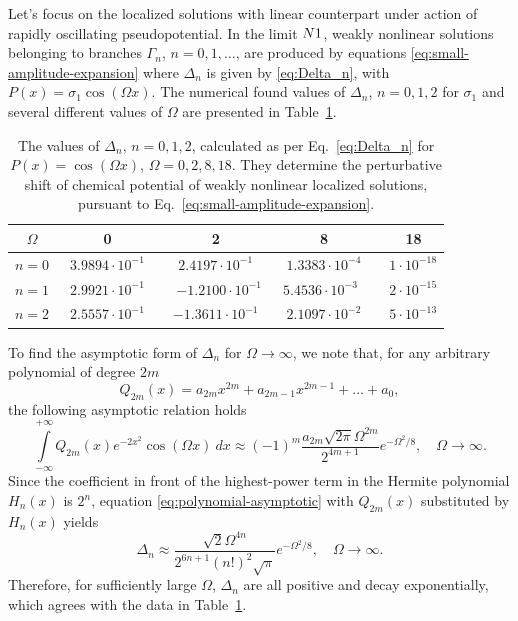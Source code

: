 Let's focus on the localized solutions with linear counterpart under action of rapidly oscillating pseudopotential.
In the limit $N \\ 1$, weakly nonlinear solutions belonging to branches $\Gamma_n$, $n = 0, 1, \dots$, are produced by equations \eqref{eq:small-amplitude-expansion} where $\Delta_n$ is given by \eqref{eq:Delta_n}, with $P(x) = \sigma_1 \cos (\Omega x)$.
The numerical found values of $\Delta_n$, $n = 0, 1, 2$ for $\sigma_1$ and several different values of $\Omega$ are presented in Table~\ref{tab:Delta_n}.
\begin{table}[tbp]
\centering
\begin{tabular}{ccccc}
\hline
	$\Omega$ & \, 0 \, & \, 2 \, & \, 8 \, & \, 18 \\ \hline
	$n = 0$ & \, $3.9894 \cdot 10^{-1}$ \, & \, $2.4197 \cdot 10^{-1}$ \, & \, $1.3383 \cdot 10^{-4}$ \, & \, $1 \cdot 10^{-18}$ \\
	$n = 1$ & \, $2.9921 \cdot 10^{-1}$ \, & \, $-1.2100 \cdot 10^{-1}$ & $5.4536 \cdot 10^{-3} $ \, & \, $2 \cdot 10^{-15}$ \\
	$n = 2$ & \, $2.5557 \cdot 10^{-1}$ \, & \, $-1.3611 \cdot 10^{-1}$ \, & \, $2.1097 \cdot 10^{-2} $ \, & \, $5 \cdot 10^{-13}$ \\ \hline
\end{tabular}
\caption{
	The values of $\Delta _{n}$, $n = 0, 1, 2$, calculated as per Eq.~\eqref{eq:Delta_n} for $P(x) = \cos \left( \Omega x \right)$, $\Omega = 0, 2, 8, 18$.
	They determine the perturbative shift of chemical potential of weakly nonlinear localized solutions, pursuant to Eq.~\eqref{eq:small-amplitude-expansion}.
}
\label{tab:Delta_n}
\end{table}

To find the asymptotic form of $\Delta_n$ for $\Omega \to \infty$, we note that, for any arbitrary polynomial of degree $2m$
\begin{equation}
	Q_{2m}(x) = a_{2m} x^{2m} + a_{2m - 1} x^{2m - 1} + \dots + a_0,
\end{equation}
the following asymptotic relation holds
\begin{equation}
	\int \limits_{-\infty}^{+\infty} Q_{2m}(x) e^{-2 x^2} \cos (\Omega x)~dx \approx (-1)^m \frac{a_{2m} \sqrt{2 \pi} \Omega^{2m}}{2^{4m + 1}} e^{-\Omega^2 / 8}, \quad \Omega \to \infty.
\label{eq:polynomial-asymptotic}
\end{equation}
Since the coefficient in front of the highest-power term in the Hermite polynomial $H_n(x)$ is $2^n$, equation \eqref{eq:polynomial-asymptotic} with $Q_{2m}(x)$ substituted by  $H_n(x)$ yields
\begin{equation}
	\Delta_n \approx \frac{\sqrt{2} \Omega^{4n}}{2^{6n + 1} (n!)^2 \sqrt{\pi}} e^{-\Omega^2 / 8}, \quad \Omega \to \infty.
\label{eq:Delta_n-asymptotic}
\end{equation}
Therefore, for sufficiently large $\Omega$, $\Delta_n$ are all positive and decay exponentially, which agrees with the data in Table~\ref{tab:Delta_n}.

